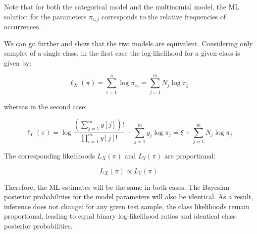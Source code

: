 Note that for both the categorical model and the multinomial model, the ML solution for the parameters $\pi_{c,j}$ corresponds to the relative frequencies of occurrences.

We can go further and show that the two models are equivalent. Considering only samples of a single class, in the first case the log-likelihood for a given class is given by:

\begin{equation*}
\ell_X(\pi) = \sum_{i=1}^n \log \pi_{x_i} = \sum_{j=1}^m N_j \log \pi_j
\end{equation*}

whereas in the second case:

\begin{equation*}
\ell_Y(\pi) = \log \frac{(\sum_{j=1}^m y[j])!}{\prod_{i=1}^m y[j]!} + \sum_{j=1}^m y_j \log \pi_j = \xi + \sum_{j=1}^m N_j \log \pi_j
\end{equation*}

The corresponding likelihoods $L_X(\pi)$ and $L_Y(\pi)$ are proportional:

\begin{equation*}
L_X(\pi) \propto L_Y(\pi)
\end{equation*}

Therefore, the ML estimates will be the same in both cases. The Bayesian posterior probabilities for the model parameters will also be identical. As a result, inference does not change: for any given test sample, the class likelihoods remain proportional, leading to equal binary log-likelihood ratios and identical class posterior probabilities.
